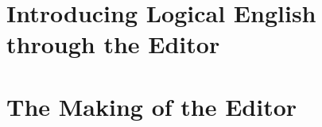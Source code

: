 \documentclass[12pt,twoside]{report}
\date{September 2022}
\begin{document}









\tableofcontents



%

\newpage
%
\part{Introducing Logical English through the Editor}

\newpage
%

\newpage

%
\part{The Making of the Editor}

\newpage
%

\newpage
%

\newpage
%

\newpage


\newpage


\newpage
%

\newpage
%

\newpage
%
% 
%

\end{document}
